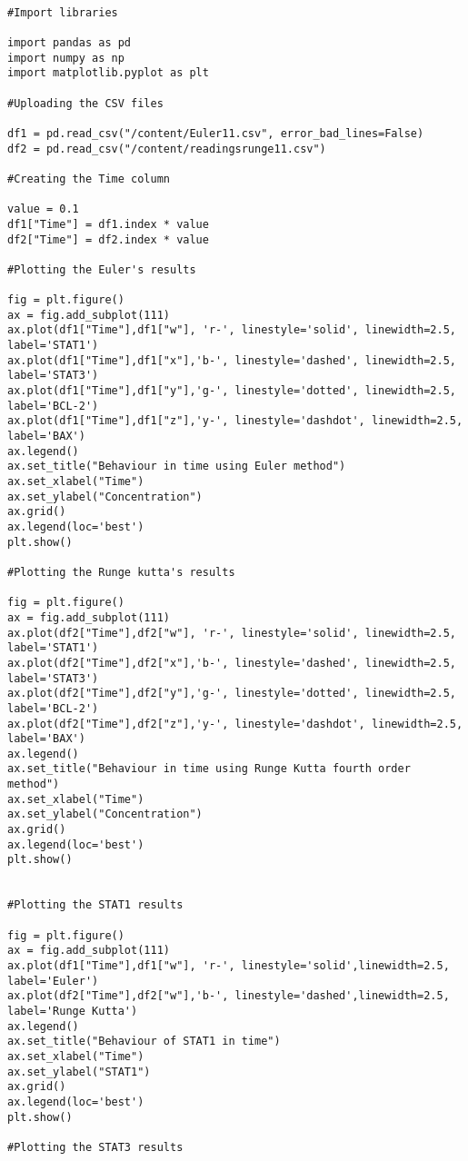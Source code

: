 \begin{framed}
\begin{verbatim}

#Import libraries

import pandas as pd
import numpy as np
import matplotlib.pyplot as plt

#Uploading the CSV files 

df1 = pd.read_csv("/content/Euler11.csv", error_bad_lines=False)
df2 = pd.read_csv("/content/readingsrunge11.csv") 

#Creating the Time column

value = 0.1
df1["Time"] = df1.index * value
df2["Time"] = df2.index * value

#Plotting the Euler's results

fig = plt.figure()
ax = fig.add_subplot(111)
ax.plot(df1["Time"],df1["w"], 'r-', linestyle='solid', linewidth=2.5, 
label='STAT1')
ax.plot(df1["Time"],df1["x"],'b-', linestyle='dashed', linewidth=2.5, 
label='STAT3')
ax.plot(df1["Time"],df1["y"],'g-', linestyle='dotted', linewidth=2.5, 
label='BCL-2')
ax.plot(df1["Time"],df1["z"],'y-', linestyle='dashdot', linewidth=2.5, 
label='BAX')
ax.legend()
ax.set_title("Behaviour in time using Euler method")
ax.set_xlabel("Time")
ax.set_ylabel("Concentration")
ax.grid()
ax.legend(loc='best')
plt.show()

#Plotting the Runge kutta's results

fig = plt.figure()
ax = fig.add_subplot(111)
ax.plot(df2["Time"],df2["w"], 'r-', linestyle='solid', linewidth=2.5, 
label='STAT1')
ax.plot(df2["Time"],df2["x"],'b-', linestyle='dashed', linewidth=2.5, 
label='STAT3')
ax.plot(df2["Time"],df2["y"],'g-', linestyle='dotted', linewidth=2.5, 
label='BCL-2')
ax.plot(df2["Time"],df2["z"],'y-', linestyle='dashdot', linewidth=2.5, 
label='BAX')
ax.legend()
ax.set_title("Behaviour in time using Runge Kutta fourth order method")
ax.set_xlabel("Time")
ax.set_ylabel("Concentration")
ax.grid()
ax.legend(loc='best')
plt.show()


#Plotting the STAT1 results

fig = plt.figure()
ax = fig.add_subplot(111)
ax.plot(df1["Time"],df1["w"], 'r-', linestyle='solid',linewidth=2.5, 
label='Euler')
ax.plot(df2["Time"],df2["w"],'b-', linestyle='dashed',linewidth=2.5, 
label='Runge Kutta')
ax.legend()
ax.set_title("Behaviour of STAT1 in time")
ax.set_xlabel("Time")
ax.set_ylabel("STAT1")
ax.grid()
ax.legend(loc='best')
plt.show()

#Plotting the STAT3 results


\end{verbatim}
\end{framed}
